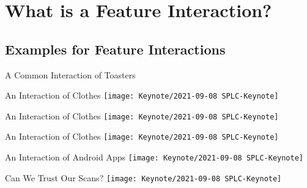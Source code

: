 \documentclass[
	aspectratio=169, %
	8pt, %
	handout, %
]{beamer}
\subtitle{9. Feature Interactions}
\author{Thomas Thüm}
\begin{document}


\section{What is a Feature Interaction?}

\subsection{Examples for Feature Interactions}
\begin{frame}{A Common Interaction of Toasters}
\end{frame}

\begin{frame}{An Interaction of Clothes}
	\centering\texttt{[image: Keynote/2021-09-08 SPLC-Keynote]}
\end{frame}
\begin{frame}{An Interaction of Clothes}
	\centering\texttt{[image: Keynote/2021-09-08 SPLC-Keynote]}
\end{frame}
\begin{frame}{An Interaction of Clothes}
	\centering\texttt{[image: Keynote/2021-09-08 SPLC-Keynote]}
\end{frame}

\begin{frame}{An Interaction of Android Apps}
	\centering\texttt{[image: Keynote/2021-09-08 SPLC-Keynote]}
\end{frame}

\begin{frame}{Can We Trust Our Scans?}
	\centering\texttt{[image: Keynote/2021-09-08 SPLC-Keynote]}
\end{frame}
\end{document}
